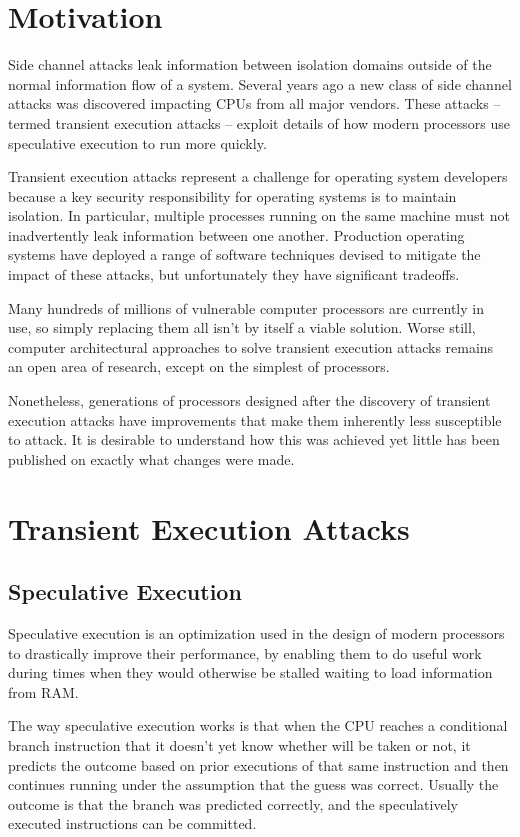 \section*{Motivation}
Side channel attacks leak information between isolation domains outside of the normal information flow of a system.
Several years ago a new class of side channel attacks was discovered impacting CPUs from all major vendors.
These attacks -- termed transient execution attacks -- exploit details of how modern processors use speculative execution to run more quickly. 

Transient execution attacks represent a challenge for operating system developers because a key security responsibility for operating systems is to maintain isolation.
In particular, multiple processes running on the same machine must not inadvertently leak information between one another.
Production operating systems have deployed a range of software techniques devised to mitigate the impact of these attacks, but unfortunately they have significant tradeoffs.

Many hundreds of millions of vulnerable computer processors are currently in use, so simply replacing them all isn’t by itself a viable solution.
Worse still, computer architectural approaches to solve transient execution attacks remains an open area of research, except on the simplest of processors.

Nonetheless, generations of processors designed after the discovery of transient execution attacks have improvements that make them inherently less susceptible to attack.
It is desirable to understand how this was achieved yet little has been published on exactly what changes were made.

\section*{Transient Execution Attacks}
\subsection*{Speculative Execution}
Speculative execution is an optimization used in the design of modern processors to drastically improve their performance, by enabling them to do useful work during times when they would otherwise be stalled waiting to load information from RAM.

The way speculative execution works is that when the CPU reaches a conditional branch instruction that it doesn't yet know whether will be taken or not, it predicts the outcome based on prior executions of that same instruction and then continues running under the assumption that the guess was correct.
Usually the outcome is that the branch was predicted correctly, and the speculatively executed instructions can be committed.

